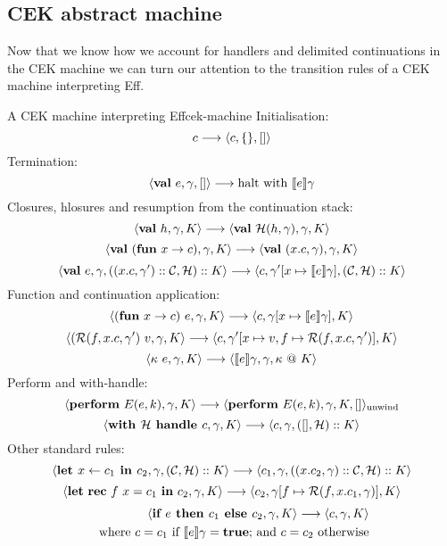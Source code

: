 \documentclass[class=article, crop=false]{standalone}
\begin{document}
\subsection{CEK abstract machine}

Now that we know how we account for handlers and delimited continuations in the CEK
machine we can turn our attention to the transition rules of a CEK machine interpreting Eff.

\begin{myfigure}{A CEK machine interpreting Eff}{cek-machine}
    Initialisation:
    $$ c \longrightarrow \langle c, \{\}, [] \rangle $$
    Termination:
    $$ \langle  \mathbf{val}\  e, \gamma, []  \rangle \longrightarrow \text{halt with } \llbracket e \rrbracket\gamma$$
    Closures, hlosures and resumption from the continuation stack:
    $$ \langle  \mathbf{val}\  h, \gamma, K \rangle \longrightarrow \langle \mathbf{val}\  \mathcal{H}(h, \gamma), \gamma, K \rangle $$
    $$ \langle  \mathbf{val}\  (\mathbf{fun}\  x \to c), \gamma, K \rangle \longrightarrow \langle \mathbf{val}\  (x.c, \gamma), \gamma, K  \rangle $$
    $$ \langle  \mathbf{val}\  e, \gamma, ((x.c, \gamma') :: \mathcal{C}, \mathcal{H}) :: K  \rangle \longrightarrow
        \langle c, \gamma'[x \mapsto \llbracket e \rrbracket\gamma], (\mathcal{C}, \mathcal{H}) :: K \rangle $$
    Function and continuation application:
    $$ \langle  (\mathbf{fun}\  x \to c)\ e, \gamma, K \rangle \longrightarrow \langle c, \gamma[x \mapsto \llbracket e \rrbracket\gamma], K  \rangle $$
    $$ \langle  (\mathcal{R}(f, x.c, \gamma')\ v, \gamma, K \rangle \longrightarrow \langle c, \gamma'[x \mapsto v, f \mapsto \mathcal{R}(f, x.c, \gamma')], K  \rangle $$
    $$ \langle \kappa\ e, \gamma, K  \rangle \longrightarrow \langle  \llbracket e \rrbracket \gamma, \gamma, \kappa\ @\ K  \rangle $$
    Perform and with-handle:
    $$ \langle  \mathbf{perform}\  E(e,k), \gamma, K  \rangle \longrightarrow \langle  \mathbf{perform}\  E(e,k), \gamma, K, []  \rangle_{\text{unwind}} $$
    $$ \langle  \textbf{with } \mathcal{H} \textbf{ handle } c, \gamma, K  \rangle \longrightarrow \langle  c, \gamma, ([], \mathcal{H}) :: K  \rangle $$
    Other standard rules:
    $$ \langle  \textbf{let } x \leftarrow c_1 \textbf{ in } c_2, \gamma, (\mathcal{C}, \mathcal{H}) :: K \rangle \longrightarrow 
    \langle  c_1, \gamma, ((x. c_2, \gamma) :: \mathcal{C}, \mathcal{H}) :: K  \rangle $$
    $$ \langle \mathbf{let}\  \mathbf{rec}\  f\ x = c_1 \ \mathbf{in}\  c_2, \gamma, K \rangle \longrightarrow
    \langle c_2, \gamma[f \mapsto \mathcal{R}(f, x.c_1, \gamma)], K \rangle $$
    \begin{align*}
    \langle  \textbf{if } e \textbf{ then } c_1 \textbf{ else } c_2, \gamma, K  \rangle \longrightarrow \langle  c, \gamma, K  \rangle \\
    \text{ where $c = c_1$ if $\llbracket e \rrbracket \gamma = \textbf{true}$; and $c = c_2$ otherwise}
    \end{align*}
\end{myfigure}
\end{document}
